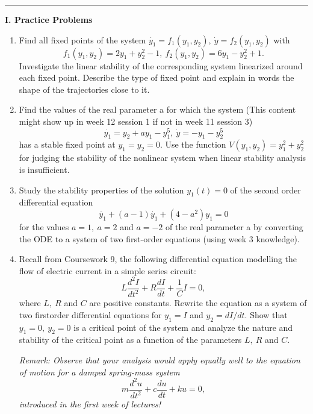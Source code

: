 \documentclass[11pt,a4paper,twoside]{article}
\begin{document}
	\rule{\textwidth}{0.4pt}
	\newpage
	\textbf{I. Practice Problems}\par
	\begin{enumerate}[\bfseries A.]
		\item Find all fixed points of the system $\dot{y_1} = f_1(y_1, y_2),\ \dot{y} = f_2(y_1, y_2)$ with
		$$
		f_1(y_1, y_2) = 2y_1 + y_2^2 - 1,\ f_2(y_1, y_2) = 6y_1 - y_2^2 + 1.
		$$
		Investigate the linear stability of the corresponding system linearized around each fixed point. Describe the type of fixed point and explain in words the shape of the trajectories close to it.
		\item Find the values of the real parameter a for which the system (This content might show up in week 12 session 1 if not in week 11 session 3)
		$$
		\dot{y_1} = y_2 + ay_1 - y_1^5,\ \dot{y} = -y_1 - y_2^5
		$$
		has a stable fixed point at $y_1 = y_2 = 0$. Use the function $V(y_1, y_2) = y^2_1 + y^2_2$ for judging the stability of the nonlinear system when linear stability analysis is insufficient.
		\item Study the stability properties of the solution $y_1(t) = 0$ of the second order differential equation
		$$
		\ddot{y_1} + (a - 1)\dot{y_1} + (4 - a^2)y_1 = 0
		$$
		for the values $a = 1,\ a = 2$ and $a = -2$ of the real parameter a by converting the ODE to a system of two first-order equations (using week 3 knowledge).
		\item Recall from Coursework 9, the following differential equation modelling the flow of electric current in a simple series circuit:
		$$
		L\frac{d^2I}{dt^2} + R\frac{dI}{dt} + \frac{1}{C}I = 0,
		$$
		where $L,\ R$ and $C$ are positive constants. Rewrite the equation as a system of two firstorder differential equations for $y_1 = I$ and $y_2 = dI/dt$. Show that $y_1 = 0,\ y_2 = 0$ is a critical point of the system and analyze the nature and stability of the critical point as a function of the parameters $L,\ R$ and $C$.\par
		\vspace{0.5cm}
		\textit{Remark: Observe that your analysis would apply equally well to the equation of motion for a damped spring-mass system}
		$$
		m\frac{d^2u}{dt^2} + c\frac{du}{dt} + ku = 0,
		$$
		\textit{introduced in the first week of lectures!}
	\end{enumerate}
\end{document}
